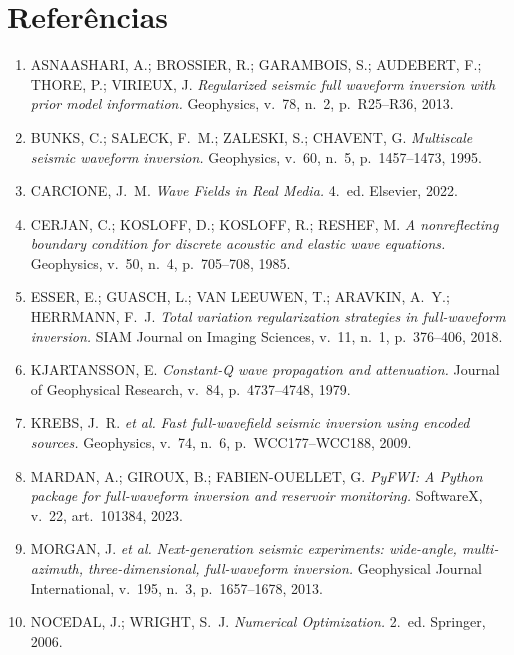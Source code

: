 \documentclass[11pt,a4paper,oneside]{report}
\begin{document}
\chapter{Refer\^encias}

\begin{enumerate}[leftmargin=*, itemsep=3pt]
\item ASNAASHARI, A.; BROSSIER, R.; GARAMBOIS, S.; AUDEBERT, F.; THORE, P.;
VIRIEUX, J.
\emph{Regularized seismic full waveform inversion with prior model
information.} Geophysics, v.~78, n.~2, p.~R25--R36, 2013.

\item BUNKS, C.; SALECK, F.~M.; ZALESKI, S.; CHAVENT, G.
\emph{Multiscale seismic waveform inversion.} Geophysics, v.~60, n.~5,
p.~1457--1473, 1995.

\item CARCIONE, J.~M. \emph{Wave Fields in Real Media.} 4.~ed. Elsevier, 2022.

\item CERJAN, C.; KOSLOFF, D.; KOSLOFF, R.; RESHEF, M. \emph{A nonreflecting
boundary condition for discrete acoustic and elastic wave equations.}
Geophysics, v.~50, n.~4, p.~705--708, 1985.

\item ESSER, E.; GUASCH, L.; VAN LEEUWEN, T.; ARAVKIN, A.~Y.; HERRMANN, F.~J.
\emph{Total variation regularization strategies in full-waveform inversion.}
SIAM Journal on Imaging Sciences, v.~11, n.~1, p.~376--406, 2018.

\item KJARTANSSON, E. \emph{Constant-Q wave propagation and attenuation.}
Journal of Geophysical Research, v.~84, p.~4737--4748, 1979.

\item KREBS, J.~R. \emph{et al.} \emph{Fast full-wavefield seismic inversion
using encoded sources.} Geophysics, v.~74, n.~6, p.~WCC177--WCC188, 2009.

\item MARDAN, A.; GIROUX, B.; FABIEN-OUELLET, G. \emph{PyFWI: A Python package
for full-waveform inversion and reservoir monitoring.} SoftwareX, v.~22,
art.~101384, 2023.

\item MORGAN, J. \emph{et al.} \emph{Next-generation seismic experiments:
wide-angle, multi-azimuth, three-dimensional, full-waveform inversion.}
Geophysical Journal International, v.~195, n.~3, p.~1657--1678, 2013.

\item NOCEDAL, J.; WRIGHT, S.~J. \emph{Numerical Optimization.} 2.~ed.
Springer, 2006.


\end{enumerate}
\end{document}
